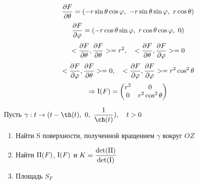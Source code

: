 \documentclass[12pt, fleqn]{article}
\begin{document}
\begin{Sol}
  \[\frac{\partial F}{\partial \theta} = (-r \sin\theta \cos\varphi,\ -r \sin\theta \sin\varphi,\ r \cos\theta)\]
  \[\frac{\partial F}{\partial \varphi} = (-r \cos\theta \sin\varphi,\ r \cos\theta \cos\varphi,\ 0)\]
  \[<\frac{\partial F}{\partial \theta}, \frac{\partial F}{\partial \theta}> = r^2,\quad
  <\frac{\partial F}{\partial \theta}, \frac{\partial F}{\partial \varphi}> = 0\]
  \[<\frac{\partial F}{\partial \varphi}, \frac{\partial F}{\partial \theta}> = 0,\quad
  <\frac{\partial F}{\partial \varphi}, \frac{\partial F}{\partial \varphi}> = r^2 \cos^2 \theta\]
  \[\Ra \RNumb{1}(F) =
  \begin{pmatrix}
    r^2 & 0\\
    0 & r^2 \cos^2 \theta
  \end{pmatrix}\]
\end{Sol}

\begin{example}
  Пусть $\gamma: t \ra (t - \th(t),\ 0,\ \dfrac{1}{\ch(t)}),\q t>0$
  \begin{enumerate}
    \item Найти S поверхности, полученной вращением $\gamma$ вокруг $OZ$
    \item Найти $\RNumb{2}(F)$, $\RNumb{1}(F)$ и $K=\dfrac{\det(\RNumb{2})}{\det(\RNumb{1})}$
    \item Площадь $S_F$
  \end{enumerate}
\end{example}

\begin{Sol}

\end{Sol}
\end{document}
